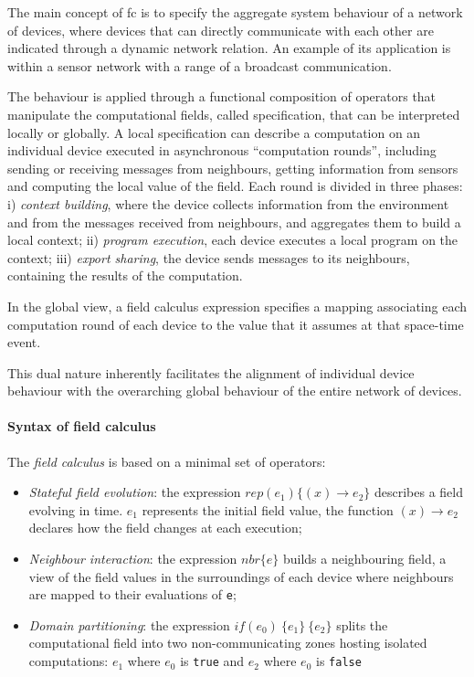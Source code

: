The main concept of \ac{fc} is to specify the aggregate system behaviour of a network of devices, where devices that can
directly communicate with each other are indicated through a dynamic network relation.
An example of its application is within a sensor network with a range of a broadcast communication.

The behaviour is applied through a functional composition of operators that manipulate the computational fields,
called specification, that can be interpreted locally or globally.
A local specification can describe a computation on an individual device executed in asynchronous ``computation rounds'',
including sending or receiving messages from neighbours, getting information from sensors and computing the local value of the field.
Each round is divided in three phases:
    i) \emph{context building}, where the device collects information from the environment and from the messages received
        from neighbours, and aggregates them to build a local context;
    ii) \emph{program execution}, each device executes a local program on the context;
    iii) \emph{export sharing}, the device sends messages to its neighbours, containing the results of the computation.

In the global view, a field calculus expression specifies a mapping associating each computation round of each device to
the value that it assumes at that space-time event.

This dual nature inherently facilitates the alignment of individual device behaviour with the overarching global behaviour
of the entire network of devices.


\paragraph{Syntax of field calculus}
\label{par:syntax-of-field-calculus}

The \emph{field calculus} is based on a minimal set of operators:
\begin{itemize}
    \item \emph{Stateful field evolution}: the expression $rep(e_1)\{(x) \rightarrow e_2\}$ describes a field evolving in time.
        $e_1$ represents the initial field value, the function $(x) \rightarrow e_2$ declares how the field changes
        at each execution;
    \item \emph{Neighbour interaction}: the expression $nbr\{e\}$ builds a neighbouring field, a view of the field
        values in the surroundings of each device where neighbours are mapped to their evaluations of \texttt{e};
    \item \emph{Domain partitioning}: the expression $if(e_0)\ \{e_1\}\ \{e_2\}$ splits the computational field into
        two non-communicating zones hosting isolated computations: $e_1$ where  $e_0$ is \texttt{true} and
        $e_2$ where  $e_0$ is \texttt{false}
\end{itemize}


